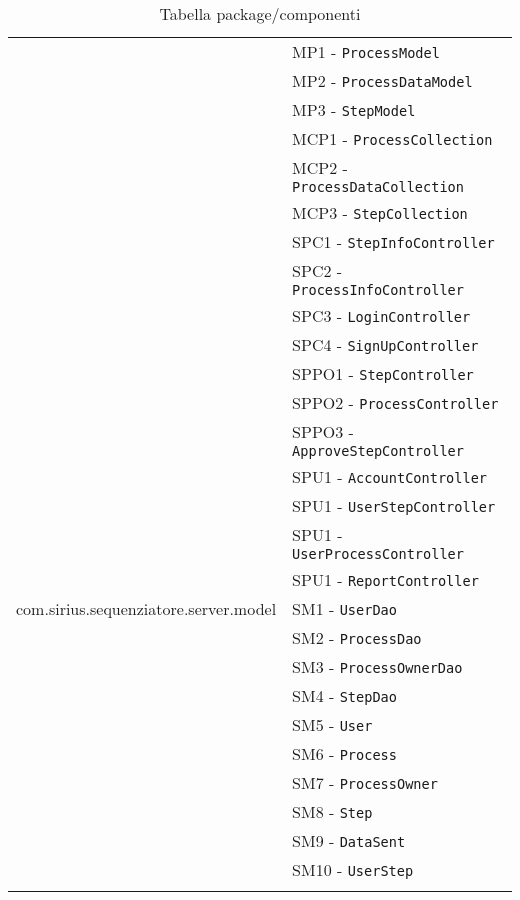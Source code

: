 \begin{longtable}{XX}
\modelAdmin{}&MP1 - \texttt{ProcessModel}\\
&MP2 - \texttt{ProcessDataModel}\\
&MP3 - \texttt{StepModel}\\
\midrule
\collectionp{}&MCP1 - \texttt{{ProcessCollection}}\\
&MCP2 - \texttt{{ProcessDataCollection}}\\
&MCP3 - \texttt{{StepCollection}}\\
\midrule


\sCommon{}&SPC1 - \texttt{StepInfoController}\\
		&SPC2 - \texttt{ProcessInfoController}\\
		&SPC3 - \texttt{LoginController}\\
		&SPC4 - \texttt{SignUpController}\\
\midrule

\sProcessOwner{}&SPPO1 - \texttt{StepController}\\
&SPPO2 - \texttt{ProcessController}\\
&SPPO3 - \texttt{ApproveStepController}\\
\midrule
\sUser{}&SPU1 - \texttt{AccountController}\\
&SPU1 - \texttt{UserStepController}\\
&SPU1 - \texttt{UserProcessController}\\
&SPU1 - \texttt{ReportController}\\
\midrule

com.sirius.sequenziatore.server.model
&SM1 - \texttt{UserDao}\\
&SM2 - \texttt{ProcessDao}\\
&SM3 - \texttt{ProcessOwnerDao}\\
&SM4 - \texttt{StepDao}\\
&SM5 - \texttt{User}\\
&SM6 - \texttt{Process}\\
&SM7 - \texttt{ProcessOwner}\\
&SM8 - \texttt{Step}\\
&SM9 - \texttt{DataSent}\\
&SM10 - \texttt{UserStep}\\
\midrule

\bottomrule
\caption{Tabella package/componenti}
\end{longtable}
